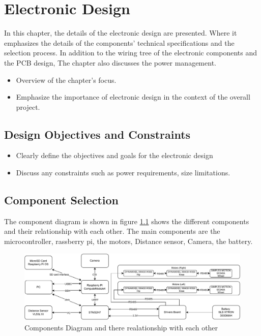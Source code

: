 \chapter{Electronic Design}

\graphicspath{{./Figures/Electronic Design/}}
In this chapter, the details of the electronic design are presented.
Where it emphasizes the details of the components' technical specifications and the selection process.
In addition to the wiring tree of the electronic components and the PCB design,
The chapter also discusses the power management.


\begin{itemize}
	\item Overview of the chapter's focus.
	\item Emphasize the importance of electronic design in the context of the overall project.
\end{itemize}


\section{Design Objectives and Constraints}
\begin{itemize}
	\item Clearly define the objectives and goals for the electronic design
	\item Discuss any constraints such as power requirements, size limitations.
\end{itemize}
\section{Component Selection}
The component diagram is shown in figure \ref{fig:componentsdiagram} shows the different components and their relationship with each other.
The main components are the microcontroller, rassberry pi, the motors, Distance sensor, Camera, the battery.
\begin{figure}[h]
	\centering
	\includegraphics[width=1\linewidth]{Component_Diagram}
	\caption[Components Diagram]{Components Diagram and there realationship with each other}
	\label{fig:componentsdiagram}
\end{figure}
